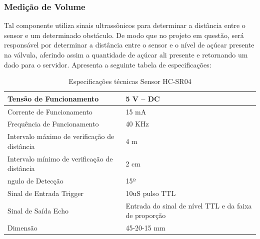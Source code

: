 \subsubsection{Medição de Volume}

Tal componente utiliza sinais ultrassônicos para determinar a distância entre o sensor e um determinado obstáculo. De modo que no projeto em questão, será responsável por determinar a distância entre o sensor e o nível de açúcar presente na válvula, aferindo assim a quantidade de açúcar ali presente e retornando um dado para o servidor. Apresenta a seguinte tabela de especificações: \nocite{28BYJ-48}

\begin{table}[h]
\centering
\caption{Especificações técnicas Sensor HC-SR04}
\resizebox{\textwidth}{!} {
\label{table2}
\begin{tabular}{|l|l|}
\hline
Tensão de Funcionamento                      & 5 V – DC                                              \\ \hline
Corrente de Funcionamento                    & 15 mA                                                 \\ \hline
Frequência de Funcionamento                  & 40 KHz                                                \\ \hline
Intervalo máximo de verificação de distância & 4 m                                                   \\ \hline
Intervalo mínimo de verificação de distância & 2 cm                                                  \\ \hline
ngulo de Detecção                            & 15º                                                   \\ \hline
Sinal de Entrada Trigger                     & 10uS pulso TTL                                        \\ \hline
Sinal de Saída Echo                          & Entrada do sinal de nível TTL e da faixa de proporção \\ \hline
Dimensão                                     & 45-20-15 mm                                           \\ \hline
\end{tabular}
}
\end{table}

